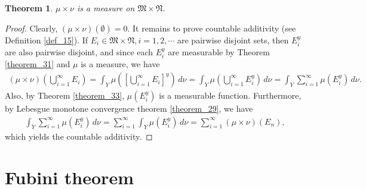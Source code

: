 \documentclass[11pt]{book}
\newtheorem{theorem}{Theorem}[chapter]
\theoremstyle{definition}
\numberwithin{equation}{chapter}
\begin{document}
\medskip

\begin{theorem}
$\mu \times \nu$ is a measure on $\mathfrak{M} \times \mathfrak{N}$.
\end{theorem}
\begin{proof}
Clearly, $(\mu \times \nu)(\emptyset) = 0$. It remains to prove countable additivity (see Definition \ref{def_15}). If $E_i \in \mathfrak{M} \times \mathfrak{N}, i = 1,2,\cdots$ are pairwise disjoint sets, then $E_i^y$ are also pairwise disjoint, and since each $E_i^y$ are measurable by Theorem \ref{theorem_31} and $\mu$ is a measure, we have
\begin{align*}
    (\mu \times \nu)\left(\bigcup^\infty_{i=1} E_i\right) = \int_Y \mu \left(\left[\bigcup^\infty_{i=1} E_i\right]^y\right)\, d\nu = \int_Y \mu \left(\bigcup^\infty_{i=1} E_i^y \right)\, d\nu = \int_Y \sum^\infty_{i=1} \mu \left(E_i^y \right)\, d\nu.
\end{align*}
Also, by Theorem \ref{theorem_33}, $\mu \left(E_i^y  \right)$ is a measurable function. Furthermore, by Lebesgue monotone convergence theorem \ref{theorem_29}, we have
\begin{align*}
    \int_Y \sum^\infty_{i=1} \mu \left(E_i^y \right)\, d\nu = \sum^\infty_{i=1} \int_Y \mu \left(E_i^y \right)\, d\nu = \sum^\infty_{i=1} (\mu \times \nu)(E_n),
\end{align*}
which yields the countable additivity.
\end{proof}

\medskip

\section{Fubini theorem}
\end{document}
